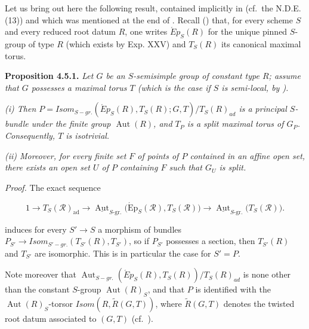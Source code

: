 Let us bring out here the following result, contained implicitly in  (cf.~the N.D.E. (13)) and which was mentioned at
the end of . Recall () that, for every scheme \(S\) and every reduced root datum \(R\), one writes
\(\acute{E}p_{S}(R)\) for the unique pinned \(S\)-group of type \(R\) (which exists by Exp. XXV) and \(T_{S}(R)\) its canonical
maximal torus.

\textbf{Proposition 4.5.1.} \emph{Let \(G\) be an \(S\)-semisimple group of constant type \(R\); assume that \(G\) possesses a maximal
torus \(T\) (which is the case if \(S\) is semi-local, by ).}

\emph{(i) Then \(P = Isom_{S-gr.}(\acute{E}p_{S}(R), T_{S}(R); G, T) / T_{S}(R)_{ad}\) is a principal \(S\)-bundle under the
finite group \(\operatorname{Aut}(R)\), and \(T_P\) is a split maximal torus of \(G_P\). Consequently, \(T\) is isotrivial.}

\emph{(ii) Moreover, for every finite set \(F\) of points of \(P\) contained in an affine open set, there exists an open set \(U\)
of \(P\) containing \(F\) such that \(G_U\) is split.}

\emph{Proof.} The exact sequence

\[
  1\longrightarrow T_S(\mathscr R)_{\mathrm{ad}}
  \longrightarrow
  \underline{\operatorname{Aut}}_{S\text{-}\mathrm{gr.}}
  \bigl(\operatorname{\acute{E}p}_S(\mathscr R),T_S(\mathscr R)\bigr)
  \longrightarrow
  \underline{\operatorname{Aut}}_{S\text{-}\mathrm{gr.}}\bigl(T_S(\mathscr R)\bigr).
\]

induces for every \(S' \to S\) a morphism of bundles \(P_{S'} \to Isom_{S'-gr.}(T_{S'}(R), T_{S'})\), so if \(P_{S'}\)
possesses a section, then \(T_{S'}(R)\) and \(T_{S'}\) are isomorphic. This is in particular the case for \(S' = P\).

Note moreover that \(\operatorname{Aut}_{S-gr.}(\acute{E}p_{S}(R), T_{S}(R)) / T_{S}(R)_{ad}\) is none other than the
constant \(S\)-group \(\operatorname{Aut}(R)_{S}\), and that \(P\) is identified with the \(\operatorname{Aut}(R)_{S}\)-torsor
\(Isom(R, \tilde{R}(G, T))\), where \(\tilde{R}(G, T)\) denotes the twisted root datum associated to \((G, T)\) (cf.~).

